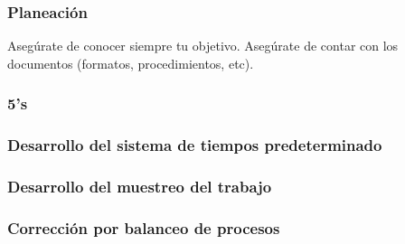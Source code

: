     \subsubsection{Planeación}
    
    Asegúrate de conocer siempre tu objetivo.
    Asegúrate de contar con los documentos (formatos, procedimientos, etc).
    \subsubsection{5's}
    \subsubsection{Desarrollo del sistema de tiempos predeterminado}
    \subsubsection{Desarrollo del muestreo del trabajo}
    \subsubsection{Corrección por balanceo de procesos}
